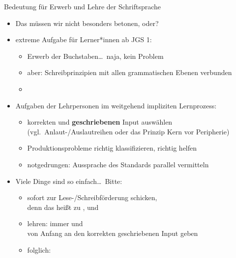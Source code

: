 \begin{frame}
  {Bedeutung für Erwerb und Lehre der Schriftsprache}
  \pause
  \begin{itemize}[<+->]
    \item Das müssen wir nicht besonders betonen, oder?
      \Halbzeile
    \item extreme Aufgabe für Lerner*innen ab JGS 1:
      \begin{itemize}[<+->]
        \item Erwerb der Buchstaben\ldots\ naja, kein Problem
        \item aber: Schreibprinzipien mit allen grammatischen Ebenen verbunden
        \item {}
      \end{itemize}
      \Halbzeile
    \item Aufgaben der Lehrpersonen im weitgehend impliziten Lernprozess:
      \begin{itemize}[<+->]
        \item \alert{korrekten und \textbf{geschriebenen} Input auswählen}\\
          (vgl.\ Anlaut-\slash Auslautreihen oder das Prinzip \alert{Kern vor Peripherie})
        \item \alert{Produktionsprobleme richtig klassifizieren, richtig helfen}
        \item notgedrungen: \alert{Aussprache des Standards parallel vermitteln}
      \end{itemize}
      \Halbzeile
    \item Viele Dinge sind so einfach\ldots\ Bitte:
      \begin{itemize}[<+->]
        \item {} sofort zur Lese-\slash Schreibförderung schicken,\\
          denn das heißt zu ,  und 
        \item {}  lehren: \alert{immer und}\\
          \alert{von Anfang an den korrekten geschriebenen Input geben}
        \item folglich:   
      \end{itemize}
  \end{itemize}
\end{frame}


